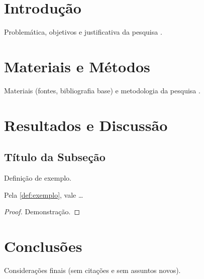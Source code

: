 
\section*{Introdução}

Problemática, objetivos e justificativa da pesquisa \parencite{doCarmo1992}.

\section*{Materiais e Métodos}

Materiais (fontes, bibliografia base) e metodologia da pesquisa
\parencite{lima1973variedades}.

\section*{Resultados e Discussão}

\subsection*{Título da Subseção}

\begin{definition}
  \label{def:exemplo}
  Definição de exemplo.
\end{definition}

\begin{theorem}
  \label{teo:exemplo}
  Pela \cref{def:exemplo}, vale \ldots
\end{theorem}

\begin{proof}
  Demonstração.
\end{proof}

\section*{Conclusões}

Considerações finais (sem citações e sem assuntos novos).

\printbibliography[title={Referências}]
